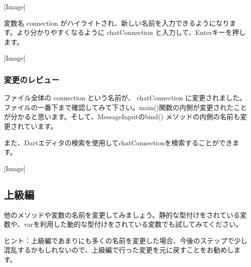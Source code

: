 [Image]

変数名 connection がハイライトされ、新しい名前を入力できるようになります。より分かりやすくなるように chatConnection と入力して、Enterキーを押します。

[Image]

\subsubsection{変更のレビュー}

ファイル全体の connection という名前が、 chatConnection に変更されました。ファイルの一番下まで確認してみて下さい。main()関数の内側が変更されたことが分かると思います。そして、MessageInputのbind() メソッドの内側の名前も変更されています。

また、Dartエディタの検索を使用してchatConnectionを検索することができます。

[Image]

\subsection{上級編}

他のメソッドや変数の名前を変更してみましょう。静的な型付けをされている変数や、varを利用した動的な型付けをされている変数でも試してみてください。

ヒント：上級編であまりにも多くの名前を変更した場合、今後のステップで少し混乱するかもしれないので、上級編で行った変更を元に戻すことをお勧めします。